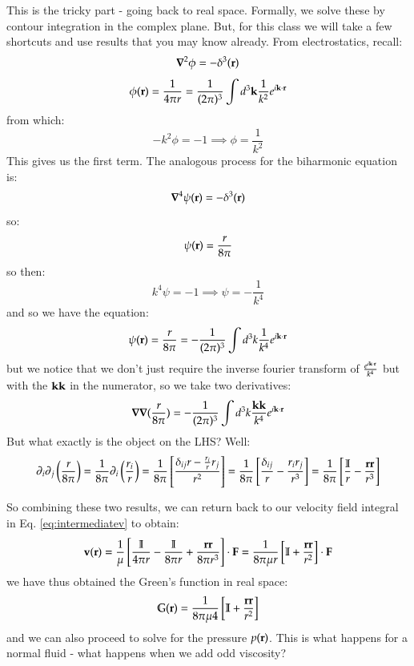 This is the tricky part - going back to real space. Formally, we solve these by contour integration in the complex plane. But, for this class we will take a few shortcuts and use results that you may know already. From electrostatics, recall:
\begin{equation}
    \nabla^2 \phi = -\delta^3(\v{r})
\end{equation}
\begin{equation}
    \phi(\mathbf{r}) = \frac{1}{4\pi r} = \frac{1}{(2\pi)^3}\int d^3\mathbf{k} \frac{1}{k^2}e^{i\mathbf{k} \cdot \mathbf{r}}
\end{equation}
from which:
\begin{equation}
    -k^2\phi = -1 \implies \phi = \frac{1}{k^2}
\end{equation}
This gives us the first term. The analogous process for the biharmonic equation is:
\begin{equation}
    \nabla^4 \psi(\v{r}) = -\delta^3(\v{r})
\end{equation}
so:
\begin{equation}
    \psi(\mathbf{r}) = \frac{r}{8\pi}
\end{equation}
so then:
\begin{equation}
    k^4\psi = -1 \implies \psi = -\frac{1}{k^4}
\end{equation}
and so we have the equation:
\begin{equation}
    \psi(\mathbf{r}) = \frac{r}{8\pi} = -\frac{1}{(2\pi)^3}\int d^3k \frac{1}{k^4}e^{i\mathbf{k} \cdot \mathbf{r}}
\end{equation}
but we notice that we don't just require the inverse fourier transform of $\frac{e^{i\mathbf{k} \cdot \mathbf{r}}}{k^4}$ but with the $\mathbf{k}\mathbf{k}$ in the numerator, so we take two derivatives:
\begin{equation}
    \nabla \nabla(\frac{r}{8\pi}) = -\frac{1}{(2\pi)^3}\int d^3k\frac{\v{k}\v{k}}{k^4}e^{i\v{k} \cdot \v{r}}
\end{equation}
But what exactly is the object on the LHS? Well:
\begin{equation}
    \partial_i \partial_j\left(\frac{r}{8\pi}\right) = \frac{1}{8\pi}\partial_i\left(\frac{r_i}{r}\right) = \frac{1}{8\pi}\left[\frac{\delta_{ij}r - \frac{r_i}{r}r_j}{r^2}\right] = \frac{1}{8\pi}\left[\frac{\delta_{ij}}{r} - \frac{r_ir_j}{r^3}\right] = \frac{1}{8\pi}\left[\frac{\mathbb{I}}{r} - \frac{\mathbf{r}\mathbf{r}}{r^3}\right]
\end{equation}

So combining these two results, we can return back to our velocity field integral in Eq. \eqref{eq:intermediatev} to obtain:
\begin{equation}
    \mathbf{v}(\mathbf{r}) = \frac{1}{\mu}\left[\frac{\mathbb{I}}{4\pi r} - \frac{\mathbb{I}}{8\pi r} + \frac{\mathbf{r} \mathbf{r}}{8\pi r^3}\right]\cdot\mathbf{F} = \frac{1}{8\pi \mu r}\left[\mathbb{I} + \frac{\mathbf{r}\mathbf{r}}{r^2}\right]\cdot\mathbf{F}
\end{equation}
we have thus obtained the Green's function in real space:
\begin{equation}
    \mathbb{G}(\mathbf{r}) = \frac{1}{8\pi \mu 4}\left[\mathbb{I} + \frac{\mathbf{r}\mathbf{r}}{r^2}\right]
\end{equation}
and we can also proceed to solve for the pressure $p(\mathbf{r})
$. This is what happens for a normal fluid - what happens when we add odd viscosity?

